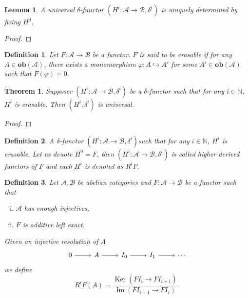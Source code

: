 \documentclass{article}
\newtheorem{theorem}{Theorem}[section]
\newtheorem{definition}{Definition}[section]
\newtheorem{lemma}{Lemma}[section]
\numberwithin{equation}{section}
\DeclareMathOperator{\Ker}{Ker}
\DeclareMathOperator{\Image}{Im}
\begin{document}
\begin{lemma}
A universal $\delta$-functor $(H^i:\mathscr{A}\to\mathscr{B},\delta^i)$ is uniquely determined by fixing $H^0$.
\end{lemma}
\begin{proof}
\end{proof}

\begin{definition}
Let $F:\mathscr{A}\to\mathscr{B}$ be a functor. $F$ is said to be erasable if for any $A\in\mathbf{ob}(\mathscr{A})$, there exists a monomorphism $\varphi:A\hookrightarrow A'$ for some $A'\in\mathbf{ob}(\mathscr{A})$ such that $F(\varphi) = 0$.
\end{definition}

\begin{theorem}
Supposer $(H^i:\mathscr{A}\to\mathscr{B},\delta^i)$ be a $\delta$-functor such that for any $i\in\mathbb{N}$, $H^i$ is erasable. Then $(H^i,\delta^i)$ is universal.
\end{theorem}

\begin{proof}
\end{proof}

\begin{definition}
A $\delta$-functor $(H^i:\mathscr{A}\to\mathscr{B},\delta^i)$such that for any $i\in\mathbb{N}$, $H^i$ is erasable. Let us denote $H^0=F$, then $(H^i:\mathscr{A}\to\mathscr{B},\delta^i)$ is called higher derived functors of $F$ and each $H^i$ is denoted as $R^iF$.
\end{definition}

\begin{definition}
Let $\mathscr{A},\mathscr{B}$ be abelian categories and $F:\mathscr{A}\to\mathscr{B}$ be a functor such that
\begin{enumerate}[i).]
\item $\mathscr{A}$ has enough injectives,
\item $F$ is additive left exact. 
\end{enumerate}
Given an injective resolution of $A$
\[
\begin{tikzcd}
0 \arrow[r] & A \arrow[r] & I_0 \arrow[r] & I_1 \arrow[r] & \cdots
\end{tikzcd}
\]
we define
\begin{equation*}
R^iF(A) = {\frac {\Ker(FI_i\to FI_{i+1})} {\Image(FI_{i-1}\to FI_i)}}.
\end{equation*}
\label{construction_higher_derivative_functors}
\end{definition}
\end{document}
